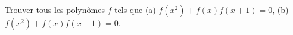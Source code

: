 Trouver tous les polynômes $f$ tels que (a) $f(x^2) + f(x)f(x + 1) = 0$, (b) $f(x^2) + f(x)f(x - 1) = 0$.
